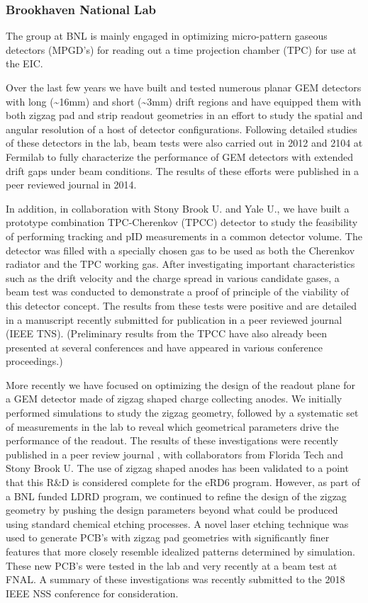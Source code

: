 \subsubsection{Brookhaven National Lab} 
The group at BNL is mainly engaged in optimizing micro-pattern gaseous detectors (MPGD’s) for reading out a time projection chamber (TPC) for use at the EIC. 

Over the last few years we have built and tested numerous planar GEM detectors with long (\textasciitilde16mm) and short (\textasciitilde3mm) drift regions and have equipped them with both zigzag pad and strip readout geometries in an effort to study the spatial and angular resolution of a host of detector configurations. Following detailed studies of these detectors in the lab, beam tests were also carried out in 2012 and 2104 at Fermilab to fully characterize the performance of GEM detectors with extended drift gaps under beam conditions. The results of these efforts were published in a peer reviewed journal in 2014\cite{7497629}.

In addition, in collaboration with Stony Brook U. and Yale U., we have built a prototype combination TPC-Cherenkov (TPCC) detector to study the feasibility of performing tracking and pID measurements in a common detector volume. The detector was filled with a specially chosen gas to be used as both the Cherenkov radiator and the TPC working gas. After investigating important characteristics such as the drift velocity and the charge spread in various candidate gases, a beam test was conducted to demonstrate a proof of principle of the viability of this detector concept. The results from these tests were positive and are detailed in a manuscript recently submitted for publication in a peer reviewed journal (IEEE TNS). (Preliminary results from the TPCC have also already been presented at several conferences and have appeared in various conference proceedings\cite{Woody:2015ola}.)

More recently we have focused on optimizing the design of the readout plane for a GEM detector made of zigzag shaped charge collecting anodes. We initially performed simulations to study the zigzag geometry, followed by a systematic set of measurements in the lab to reveal which geometrical parameters drive the performance of the readout. The results of these investigations were recently published in a peer review journal \cite{8379440}, with collaborators from Florida Tech and Stony Brook U. The use of zigzag shaped anodes has been validated to a point that this R\&D is considered complete for the eRD6 program. However, as part of a BNL funded LDRD program, we continued to refine the design of the zigzag geometry by pushing the design parameters beyond what could be produced using standard chemical etching processes. A novel laser etching technique was used to generate PCB’s with zigzag pad geometries with significantly finer features that more closely resemble idealized patterns determined by simulation. These new PCB’s were tested in the lab and very recently at a beam test at FNAL. A summary of these investigations was recently submitted to the 2018 IEEE NSS conference for consideration. 

